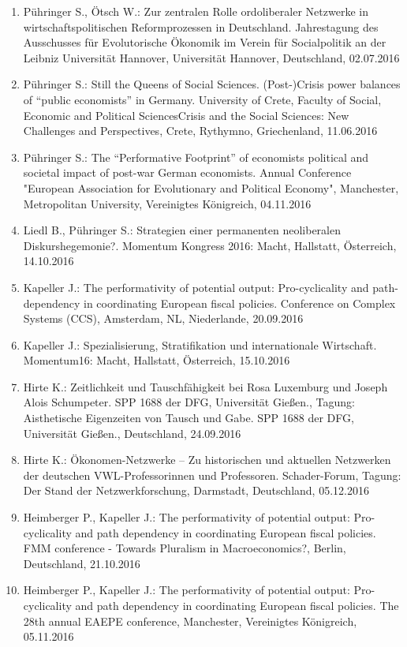 \begin{enumerate}
	\item Pühringer S., Ötsch W.: Zur zentralen Rolle ordoliberaler Netzwerke in wirtschaftspolitischen Reformprozessen in Deutschland. Jahrestagung des Ausschusses für Evolutorische Ökonomik im Verein für Socialpolitik an der Leibniz Universität Hannover, Universität Hannover, Deutschland, 02.07.2016
	\item Pühringer S.: Still the Queens of Social Sciences. (Post-)Crisis power balances  of “public economists” in Germany. University of Crete, Faculty of Social, Economic and Political SciencesCrisis and the Social Sciences: New Challenges and Perspectives, Crete, Rythymno, Griechenland, 11.06.2016
	\item Pühringer S.: The “Performative Footprint” of economists political and societal impact of post-war German economists. Annual Conference "European Association for Evolutionary and Political Economy", Manchester, Metropolitan University, Vereinigtes Königreich, 04.11.2016
	\item Liedl B., Pühringer S.: Strategien einer permanenten neoliberalen Diskurshegemonie?. Momentum Kongress 2016: Macht, Hallstatt, Österreich, 14.10.2016
	\item Kapeller J.: The performativity of potential output: Pro-cyclicality and path-dependency in coordinating European fiscal policies. Conference on Complex Systems (CCS), Amsterdam, NL, Niederlande, 20.09.2016
	\item Kapeller J.: Spezialisierung, Stratifikation und internationale Wirtschaft. Momentum16: Macht, Hallstatt, Österreich, 15.10.2016
	\item Hirte K.: Zeitlichkeit und Tauschfähigkeit bei Rosa Luxemburg und Joseph Alois Schumpeter. SPP 1688 der DFG, Universität Gießen., Tagung: Aisthetische Eigenzeiten von Tausch und Gabe. SPP 1688 der DFG, Universität Gießen., Deutschland, 24.09.2016
	\item Hirte K.: Ökonomen-Netzwerke – Zu historischen und aktuellen Netzwerken der deutschen VWL-Professorinnen und Professoren. Schader-Forum, Tagung: Der Stand der Netzwerkforschung, Darmstadt, Deutschland, 05.12.2016
	\item Heimberger P., Kapeller J.: The performativity of potential output: Pro-cyclicality and path dependency in coordinating European fiscal policies. FMM conference - Towards Pluralism in Macroeconomics?, Berlin, Deutschland, 21.10.2016
	\item Heimberger P., Kapeller J.: The performativity of potential output: Pro-cyclicality and path dependency in coordinating European fiscal policies. The 28th annual EAEPE conference, Manchester, Vereinigtes Königreich, 05.11.2016

\end{enumerate}
